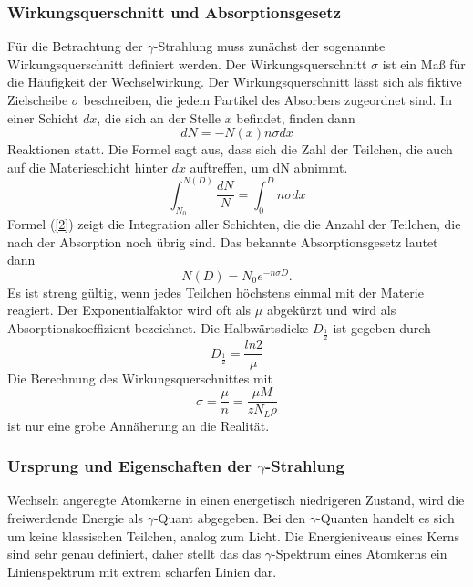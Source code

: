 \documentclass[11pt,ngerman,a4paper]{article}
\begin{document}
\subsubsection{Wirkungsquerschnitt und Absorptionsgesetz}
Für die Betrachtung der $\gamma$-Strahlung muss zunächst der sogenannte Wirkungsquerschnitt definiert werden. \newline
Der Wirkungsquerschnitt $\sigma$ ist ein Maß für die Häufigkeit der Wechselwirkung. Der Wirkungsquerschnitt lässt sich als fiktive Zielscheibe $\sigma$ beschreiben, die jedem Partikel des Absorbers zugeordnet sind. In einer Schicht $dx$, die sich an der Stelle $x$ befindet, finden dann
\begin{equation}
dN = -N(x)n\sigma dx
\label{1}
\end{equation}
Reaktionen statt. Die Formel sagt aus, dass sich die Zahl der Teilchen, die auch auf die Materieschicht hinter $dx$ auftreffen, um dN abnimmt.
\begin{equation}
\int_{N_0}^{N(D)} \frac{dN}{N} = \int_0^D n\sigma dx
\label{2}
\end{equation}
Formel (\ref{2}) zeigt die Integration aller Schichten, die die Anzahl der Teilchen, die nach der Absorption noch übrig sind. Das bekannte Absorptionsgesetz lautet dann
\begin{equation}
N(D) = N_0e^{-n\sigma D}.
\label{3}
\end{equation}
Es ist streng gültig, wenn jedes Teilchen höchstens einmal mit der Materie reagiert. Der Exponentialfaktor wird oft als $\mu$ abgekürzt und wird als Absorptionskoeffizient bezeichnet.
Die Halbwärtsdicke $D_{\frac{1}{2}}$ ist gegeben durch
\begin{equation}
D_{\frac{1}{2}} = \frac{ln 2}{\mu}
\label{4}
\end{equation}
Die Berechnung des Wirkungsquerschnittes mit
\begin{equation}
\sigma = \frac{\mu}{n} = \frac{\mu M}{zN_L\rho}
\label{5}
\end{equation}
ist nur eine grobe Annäherung an die Realität.
\subsubsection{Ursprung und Eigenschaften der $\gamma$-Strahlung}
Wechseln angeregte Atomkerne in einen energetisch niedrigeren Zustand, wird die freiwerdende Energie als $\gamma$-Quant abgegeben. Bei den $\gamma$-Quanten handelt es sich um keine klassischen Teilchen, analog zum Licht. Die Energieniveaus eines Kerns sind sehr genau definiert, daher stellt das das $\gamma$-Spektrum eines Atomkerns ein Linienspektrum mit extrem scharfen Linien dar.
\end{document}
